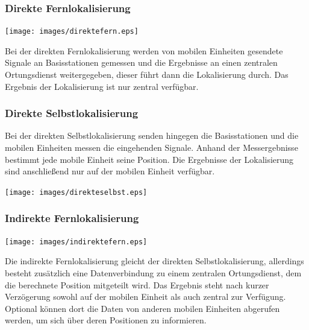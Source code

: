 \subsubsection{Direkte Fernlokalisierung}
	\begin{minipage}{\textwidth}
		\begin{minipage}[c][6cm][c]{0.5\textwidth\relax}
			\centering
			\texttt{[image: images/direktefern.eps]}
		\end{minipage}\hfill
		\begin{minipage}[c][6cm][t]{0.5\textwidth\relax}
			Bei der direkten Fernlokalisierung werden von mobilen Einheiten gesendete Signale an Basisstationen gemessen und die Ergebnisse an einen zentralen Ortungsdienst weitergegeben, dieser führt dann die Lokalisierung durch. Das Ergebnis der Lokalisierung ist nur zentral verfügbar.
		\end{minipage}
	\end{minipage}


\subsubsection{Direkte Selbstlokalisierung}
	\begin{minipage}{\textwidth}
		\begin{minipage}[c][6cm][t]{0.5\textwidth\relax}
			Bei der direkten Selbstlokalisierung senden hingegen die Basisstationen und die mobilen Einheiten messen die eingehenden Signale. Anhand der Messergebnisse bestimmt jede mobile Einheit seine Position.
			Die Ergebnisse der Lokalisierung sind anschließend nur auf der mobilen Einheit verfügbar.
		\end{minipage}\hfill
		\begin{minipage}[c][6cm][c]{0.5\textwidth\relax}
			\centering
			\texttt{[image: images/direkteselbst.eps]}
		\end{minipage}
	\end{minipage}


\subsubsection{Indirekte Fernlokalisierung}
	\begin{minipage}{\textwidth}
		\begin{minipage}[c][6cm][c]{0.5\textwidth\relax}
			\centering
			\texttt{[image: images/indirektefern.eps]}
		\end{minipage}\hfill
		\begin{minipage}[c][6cm][t]{0.5\textwidth\relax}
			Die indirekte Fernlokalisierung gleicht der direkten Selbstlokalisierung, allerdings besteht zusätzlich eine Datenverbindung zu einem zentralen Ortungsdienst, dem die berechnete Position mitgeteilt wird.
			Das Ergebnis steht nach kurzer Verzögerung sowohl auf der mobilen Einheit als auch zentral zur Verfügung.
Optional können dort die Daten von anderen mobilen Einheiten abgerufen werden, um sich über deren Positionen zu informieren.
		\end{minipage}
	\end{minipage}


